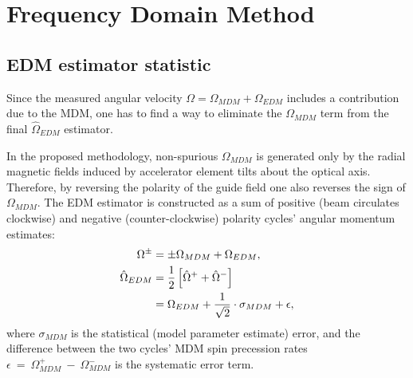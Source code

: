 \documentclass[12pt]{article}
\newcommand{\avg}[1]{\langle{#1}\rangle}
\newcommand{\W}{\Omega}
\begin{document}
%
%

\section{Frequency Domain Method}
\subsection{EDM estimator statistic}
Since the measured angular velocity $\W = \W_{MDM} + \W_{EDM}$ includes a contribution due to the MDM, one has to find a way to eliminate the $\W_{MDM}$ term from the final $\hat\W_{EDM}$ estimator. 

In the proposed methodology, non-spurious $\W_{MDM}$ is generated only by the radial magnetic fields induced by accelerator element tilts about the optical axis. Therefore, by reversing the polarity of the guide field one also reverses the sign of $\W_{MDM}$. The EDM estimator is constructed as a sum of positive (beam circulates clockwise) and negative (counter-clockwise) polarity cycles' angular momentum estimates:
\begin{align}
	\W^{\pm} &= \pm \W_{MDM} + \W_{EDM},\\
	\hat\W_{EDM} &= \frac12\left[\hat\W^+ + \hat\W^-\right] \notag\\
	&= \W_{EDM} + \frac{1}{\sqrt{2}}\cdot\sigma_{MDM} + \epsilon,	\label{eq:EDM-estimator}
\end{align}
where
$\sigma_{MDM}$ is  the statistical (model parameter estimate) error, and the difference between the two cycles' MDM spin precession rates $\epsilon~=~\W_{MDM}^+~-~\W_{MDM}^-$ is the  systematic error term.
\end{document}
